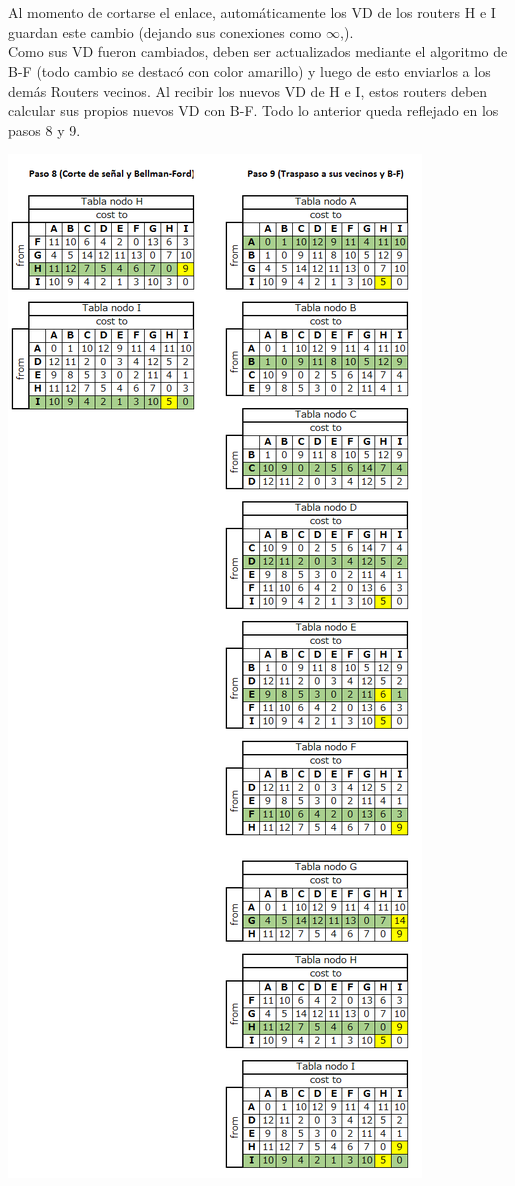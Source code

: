 \documentclass{article}
\begin{document}
\section{}
Al momento de cortarse el enlace, automáticamente los VD de los routers H e I guardan este cambio (dejando sus conexiones como $\infty$,).\\
Como sus VD fueron cambiados, deben ser actualizados mediante el algoritmo de B-F (todo cambio se destacó con color amarillo) y luego de esto enviarlos a los demás Routers vecinos. Al recibir los nuevos VD de H e I, estos routers deben calcular sus propios nuevos VD con B-F. Todo lo anterior queda reflejado en los pasos 8 y 9.\\
\centerline{\includegraphics[scale=0.5]{Img/paso89.png}}\\
\end{document}

